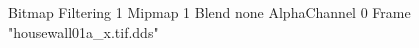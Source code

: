 {Bitmap
	{Filtering 1}
	{Mipmap 1}
	{Blend none}
	{AlphaChannel 0}
	{Frame "housewall01a_x.tif.dds"}
}

